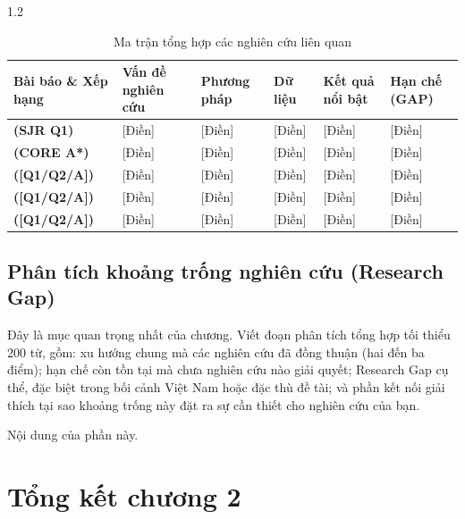 \begin{spacing}{1.2}
\begin{table}[htpb]
\centering
\caption{Ma trận tổng hợp các nghiên cứu liên quan}
\label{tab:synthesis_matrix}
\renewcommand{\arraystretch}{1.3}
{\fontsize{10}{12}\selectfont
\begin{tabularx}{\textwidth}{|>{\centering\arraybackslash}p{1.8cm}|X|X|X|X|X|}
\hline
\textbf{Bài báo \& Xếp hạng} & \textbf{Vấn đề nghiên cứu} & \textbf{Phương pháp} & \textbf{Dữ liệu} & \textbf{Kết quả nổi bật} & \textbf{Hạn chế (GAP)} \\
\hline
\cite{vidu_tapchi}\newline \textbf{(SJR Q1)} & [Điền] & [Điền] & [Điền] & [Điền] & [Điền] \\
\hline
\cite{vidu_hoinghi}\newline \textbf{(CORE A*)} & [Điền] & [Điền] & [Điền] & [Điền] & [Điền] \\
\hline
[Bài báo 3]\newline \textbf{([Q1/Q2/A])} & [Điền] & [Điền] & [Điền] & [Điền] & [Điền] \\
\hline
[Bài báo 4]\newline \textbf{([Q1/Q2/A])} & [Điền] & [Điền] & [Điền] & [Điền] & [Điền] \\
\hline
[Bài báo 5]\newline \textbf{([Q1/Q2/A])} & [Điền] & [Điền] & [Điền] & [Điền] & [Điền] \\
\hline
\end{tabularx}
}
\end{table}

\subsection{Phân tích khoảng trống nghiên cứu (Research Gap)}
\label{subsec:research_gap}

\begin{huongdan}
Đây là mục quan trọng nhất của chương. Viết đoạn phân tích tổng hợp tối thiểu 200 từ, gồm: xu hướng chung mà các nghiên cứu đã đồng thuận (hai đến ba điểm); hạn chế còn tồn tại mà chưa nghiên cứu nào giải quyết; Research Gap cụ thể, đặc biệt trong bối cảnh Việt Nam hoặc đặc thù đề tài; và phần kết nối giải thích tại sao khoảng trống này đặt ra sự cần thiết cho nghiên cứu của bạn.
\end{huongdan}

Nội dung của phần này.

\section{Tổng kết chương 2}
\label{sec:tong_ket_c2}


\end{spacing}
